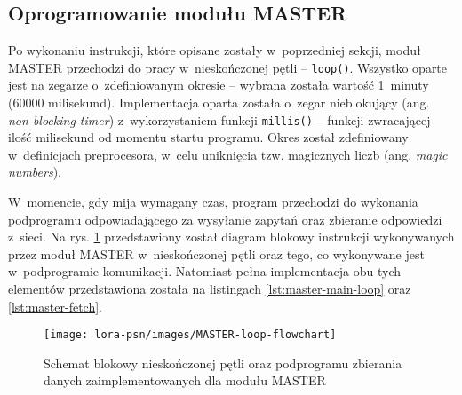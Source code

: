 



\FloatBarrier
\subsection{Oprogramowanie modułu MASTER\label{sect:firmware-master}} Po wykonaniu instrukcji, które
opisane zostały w~poprzedniej sekcji, moduł MASTER przechodzi do pracy w~nieskończonej pętli -- \texttt{loop()}.
Wszystko oparte jest na zegarze o~zdefiniowanym okresie -- wybrana została wartość 1~minuty (60000 milisekund).
Implementacja oparta została o~zegar nieblokujący (ang. \textsl{non-blocking timer}) z~wykorzystaniem funkcji
\texttt{millis()} -- funkcji zwracającej ilość milisekund od momentu startu programu. Okres został zdefiniowany
w~definicjach preprocesora, w~celu uniknięcia tzw. magicznych liczb (ang. \textsl{magic numbers}).

W~momencie, gdy mija wymagany czas, program przechodzi do wykonania podprogramu odpowiadającego za wysyłanie zapytań
oraz zbieranie odpowiedzi z~sieci. Na rys. \ref{img:master-flowchart} przedstawiony został diagram blokowy instrukcji
wykonywanych przez moduł MASTER w~nieskończonej pętli oraz tego, co wykonywane jest w~podprogramie komunikacji.
Natomiast pełna implementacja obu tych elementów przedstawiona została na listingach \ref{lst:master-main-loop} oraz
\ref{lst:master-fetch}.

\begin{figure}[!htbp]
    \centering
    \texttt{[image: lora-psn/images/MASTER-loop-flowchart]}
    \caption{\label{img:master-flowchart}Schemat blokowy nieskończonej pętli oraz podprogramu zbierania danych
        zaimplementowanych dla modułu MASTER}
\end{figure}



